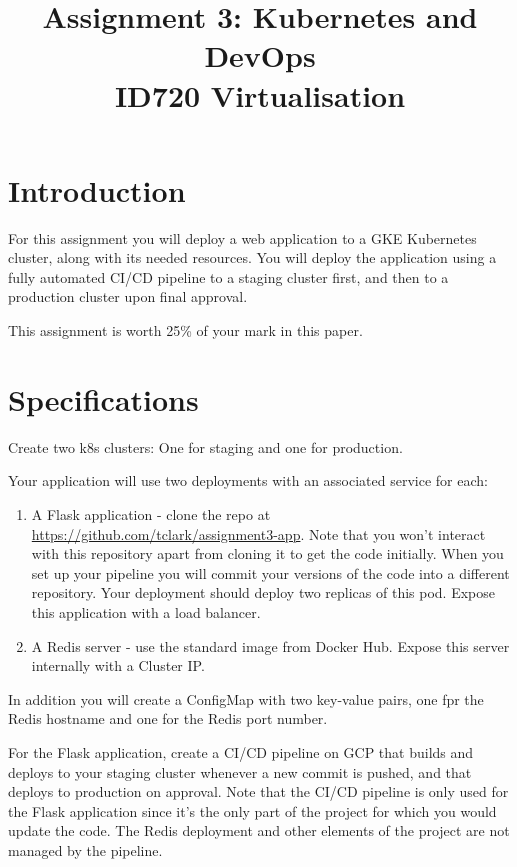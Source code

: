 \documentclass{article}
\begin{document}
\title{Assignment 3: Kubernetes and DevOps \\ ID720 Virtualisation}
\date{}
\maketitle

\section*{Introduction}
For this assignment you will deploy a web application to a GKE Kubernetes cluster, along with its needed resources. You will deploy the application using a fully automated CI/CD pipeline to a staging cluster first, and then to a production cluster upon final approval.

This assignment is worth 25\% of your mark in this paper.

\section{Specifications}

Create two k8s clusters: One for staging and one for production.

Your application will use two deployments with an associated service for each:
  \begin{enumerate}
    \item A Flask application - clone the repo at \url{https://github.com/tclark/assignment3-app}. Note that you won't interact with this repository apart from cloning it to get the code initially. When you set up your pipeline you will commit your versions of the code into a different repository. Your deployment should deploy two replicas of this pod. Expose this application with a load balancer.
    \item A Redis server - use the standard image from Docker Hub. Expose this server internally with a Cluster IP.
  \end{enumerate}
    
In addition you will create a ConfigMap with two key-value pairs, one fpr the Redis hostname and one for the Redis port number. 

For the Flask application, create a CI/CD pipeline on GCP that builds and deploys to your staging cluster whenever a new commit is pushed, and that deploys to production on approval. Note that the CI/CD pipeline is only used for the Flask application since it's the only part of the project for which you would update the code. The Redis deployment and other elements of the project are not managed by the pipeline.
\end{document}
